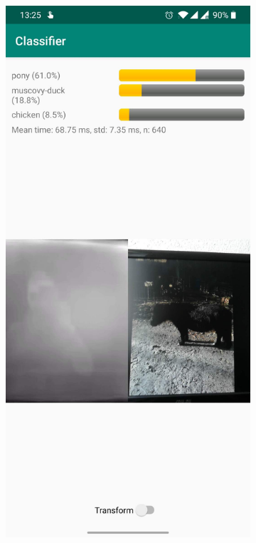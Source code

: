 \documentclass{l4proj}
\begin{document}
\begin{figure}[ht]
\begin{subfigure}[h!]{0.3\textwidth}
  \end{subfigure}
  \begin{subfigure}[h!]{0.3\textwidth}
    \includegraphics[width=\textwidth, trim={0cm, 22cm, 0cm, 0cm}, clip]{images/app/screenshot_1.jpg}

\end{subfigure}
\end{figure}
\end{document}
